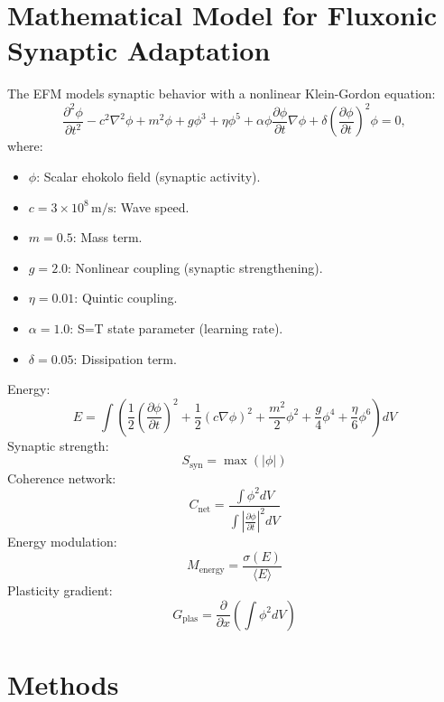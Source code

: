 \documentclass[11pt]{article}
\begin{document}
\section{Mathematical Model for Fluxonic Synaptic Adaptation}
The EFM models synaptic behavior with a nonlinear Klein-Gordon equation:
\begin{equation}
\frac{\partial^2 \phi}{\partial t^2} - c^2 \nabla^2 \phi + m^2 \phi + g \phi^3 + \eta \phi^5 + \alpha \phi \frac{\partial \phi}{\partial t} \nabla \phi + \delta \left(\frac{\partial \phi}{\partial t}\right)^2 \phi = 0,
\end{equation}
where:
\begin{itemize}
    \item \(\phi\): Scalar ehokolo field (synaptic activity).
    \item \(c = 3 \times 10^8 \, \text{m/s}\): Wave speed.
    \item \(m = 0.5\): Mass term.
    \item \(g = 2.0\): Nonlinear coupling (synaptic strengthening).
    \item \(\eta = 0.01\): Quintic coupling.
    \item \(\alpha = 1.0\): S=T state parameter (learning rate).
    \item \(\delta = 0.05\): Dissipation term.
\end{itemize}
Energy:
\begin{equation}
E = \int \left( \frac{1}{2} \left(\frac{\partial \phi}{\partial t}\right)^2 + \frac{1}{2} (c \nabla \phi)^2 + \frac{m^2}{2} \phi^2 + \frac{g}{4} \phi^4 + \frac{\eta}{6} \phi^6 \right) dV
\end{equation}
Synaptic strength:
\begin{equation}
S_{\text{syn}} = \max(|\phi|)
\end{equation}
Coherence network:
\begin{equation}
C_{\text{net}} = \frac{\int \phi^2 dV}{\int \left| \frac{\partial \phi}{\partial t} \right|^2 dV}
\end{equation}
Energy modulation:
\begin{equation}
M_{\text{energy}} = \frac{\sigma(E)}{\langle E \rangle}
\end{equation}
Plasticity gradient:
\begin{equation}
G_{\text{plas}} = \frac{\partial}{\partial x} \left( \int \phi^2 dV \right)
\end{equation}

\section{Methods}
\end{document}
